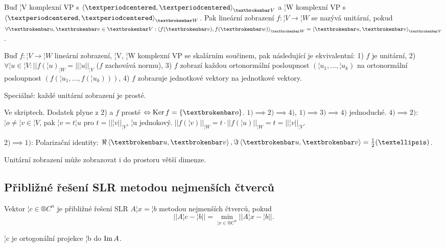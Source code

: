 \documentclass[12pt]{article}                   %
\begin{document}
        \begin{definice}
            Buď ¦V komplexní VP s $\<·, ·\>_{¦V}$ a ¦W komplexní VP s $\<·, ·\>_{¦W}$. Pak lineární zobrazení $f: ¦V \rightarrow ¦W$ se nazývá unitární, pokud $\forall ¦u, ¦v \in ¦V: \<f(¦v), f(¦w)\>_{¦W} = \<¦u, ¦v\>_{¦V}$.
        \end{definice}

        \begin{tvrzeni}
            Buď $f: ¦V \rightarrow ¦W$ lineární zobrazení, ¦V, ¦W komplexní VP se skalárním součinem, pak následující je ekvivalentní: 1) $f$ je unitární, 2) $\forall ¦u \in ¦V: ||f(¦u)_{¦W} = ||¦u||_{¦V}$ ($f$ zachovává normu), 3) $f$ zobrazí každou ortonormální posloupnost $(¦u_1, …, ¦u_k)$ na ortonormální posloupnost $(f(¦u_1, …, f(¦u_k)))$, 4) $f$ zobrazuje jednotkové vektory na jednotkové vektory.

            Speciálně: každé unitární zobrazení je prosté.

            \begin{dukazin}
                Ve skriptech. Dodatek plyne z 2) a $f$ prosté $\Leftrightarrow \Ker f = \{¦o\}$. $1) \implies 2) \implies 4)$, $1) \implies 3) \implies 4)$ jednoduché. $4) \implies 2)$: $¦o≠¦v \in ¦V$, pak $¦v = t¦u$ pro $t = ||¦v||_{¦V}$, ¦u jednokový. $||f(¦v)||_{¦W} = t·||f(¦u)||_{¦W} = t = ||¦v||_{¦V}$.

                $2) \implies 1)$: Polarizační identity: $\Re\<¦u, ¦v\>, \Im\<¦u, ¦v\> = \frac{1}{2}(…)$.
            \end{dukazin}
        \end{tvrzeni}

        \begin{poznamka}
            Unitární zobrazení může zobrazovat i do prostoru větší dimenze.
        \end{poznamka}

    \subsection{Přibližné řešení SLR metodou nejmenších čtverců}
        \begin{definice}
            Vektor $¦c \in ®C^n$ je přibližné řešení SLR $A¦x = ¦b$ metodou nejmenších čtverců, pokud
            $$ ||A¦c - ¦b|| = \min_{¦x \in ®C^n} ||A¦x - ¦b||. $$ 
        \end{definice}

        \begin{dusledek}
            ¦c je ortogonální projekce ¦b do $\operatorname{Im} A$.
        \end{dusledek}
\end{document}
